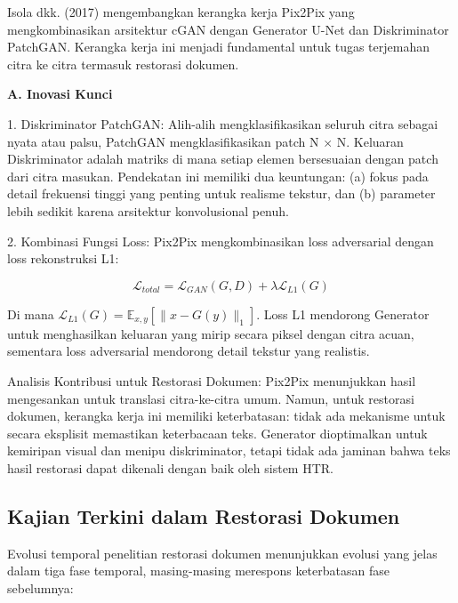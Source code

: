 \documentclass[12pt,a4paper]{book}
\begin{document}
\vspace{1.5ex}

Isola dkk. (2017) mengembangkan kerangka kerja Pix2Pix yang mengkombinasikan arsitektur cGAN dengan Generator U-Net dan Diskriminator PatchGAN. Kerangka kerja ini menjadi fundamental untuk tugas terjemahan citra ke citra termasuk restorasi dokumen.

\vspace{0.5ex}
\noindent\textbf{A. Inovasi Kunci}

1. Diskriminator PatchGAN: Alih-alih mengklasifikasikan seluruh citra sebagai nyata atau palsu, PatchGAN mengklasifikasikan patch N × N. Keluaran Diskriminator adalah matriks di mana setiap elemen bersesuaian dengan patch dari citra masukan. Pendekatan ini memiliki dua keuntungan: (a) fokus pada detail frekuensi tinggi yang penting untuk realisme tekstur, dan (b) parameter lebih sedikit karena arsitektur konvolusional penuh.

2. Kombinasi Fungsi Loss: Pix2Pix mengkombinasikan loss adversarial dengan loss rekonstruksi L1:

\begin{equation}
\mathcal{L}_{total} = \mathcal{L}_{GAN}(G, D) + \lambda \mathcal{L}_{L1}(G)
\end{equation}

Di mana $\mathcal{L}_{L1}(G) = \mathbb{E}_{x, y}[\|x - G(y)\|_1]$. Loss L1 mendorong Generator untuk menghasilkan keluaran yang mirip secara piksel dengan citra acuan, sementara loss adversarial mendorong detail tekstur yang realistis.

Analisis Kontribusi untuk Restorasi Dokumen: Pix2Pix menunjukkan hasil mengesankan untuk translasi citra-ke-citra umum. Namun, untuk restorasi dokumen, kerangka kerja ini memiliki keterbatasan: tidak ada mekanisme untuk secara eksplisit memastikan keterbacaan teks. Generator dioptimalkan untuk kemiripan visual dan menipu diskriminator, tetapi tidak ada jaminan bahwa teks hasil restorasi dapat dikenali dengan baik oleh sistem HTR.



\subsection{Kajian Terkini dalam Restorasi Dokumen}
\label{subsec:sota-analysis}

\vspace{1.5ex}

Evolusi temporal penelitian restorasi dokumen menunjukkan evolusi yang jelas dalam tiga fase temporal, masing-masing merespons keterbatasan fase sebelumnya:
\end{document}
